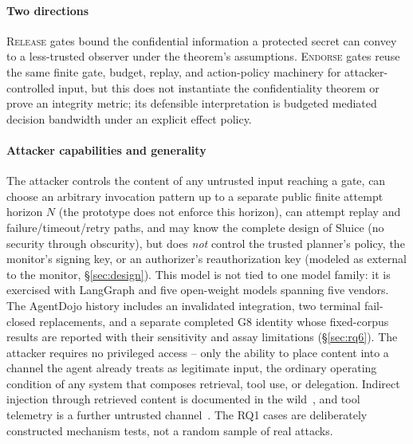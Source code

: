 \documentclass[conference,compsoc]{IEEEtran}
\newcommand{\rev}[1]{#1} %
\newcommand{\sys}{Sluice}
\begin{document}
\paragraph{Two directions} \textsc{Release} gates bound the confidential
information a protected secret can convey to a less-trusted observer under
the theorem's assumptions. \textsc{Endorse} gates reuse the same finite gate,
budget, replay, and action-policy machinery for attacker-controlled input,
but this does not instantiate the confidentiality theorem or prove an
integrity metric; its defensible interpretation is budgeted mediated
decision bandwidth under an explicit effect policy.

\paragraph{Attacker capabilities and generality} The attacker controls
the content of any untrusted input reaching a gate, can choose an arbitrary
invocation pattern up to a separate public finite attempt horizon $N$ (the
prototype does not enforce this horizon), can attempt replay and
failure/timeout/retry paths, and may
know the complete design of \sys{} (no security through obscurity), but
does \emph{not} control the trusted planner's policy, the monitor's
signing key, or an authorizer's reauthorization key (modeled as
external to the monitor, \S\ref{sec:design}). This model is not tied to
one model family: it is exercised with LangGraph and five open-weight
models spanning five vendors. The AgentDojo history includes an invalidated
integration, two terminal fail-closed replacements, and a separate completed
G8 identity whose fixed-corpus results are reported with their sensitivity and
assay limitations (\S\ref{sec:rq6}). The attacker
requires no privileged access -- only the ability to place content into a
channel the agent
already treats as legitimate input, the ordinary operating condition of
any system that composes retrieval, tool use, or delegation. \rev{Indirect injection through retrieved content is documented in the wild~\cite{greshake2023,retrievalbarrier2026}, and tool telemetry is a further untrusted channel~\cite{aiops2026}.} The
RQ1 cases are deliberately constructed mechanism tests, not a random sample
of real attacks.
\end{document}
